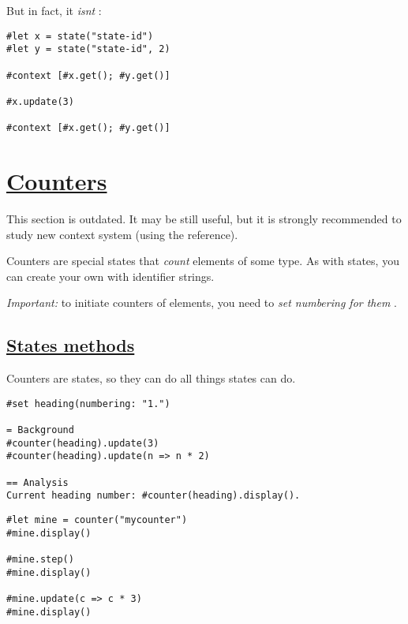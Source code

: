 But in fact, it \emph{isn\textquotesingle t} :

\begin{verbatim}
#let x = state("state-id")
#let y = state("state-id", 2)

#context [#x.get(); #y.get()]

#x.update(3)

#context [#x.get(); #y.get()]
\end{verbatim}

\pandocbounded{}

\section{\texorpdfstring{\hyperref[counters]{Counters}}{Counters}}\label{counters}

This section is outdated. It may be still useful, but it is strongly
recommended to study new context system (using the reference).

Counters are special states that \emph{count} elements of some type. As
with states, you can create your own with identifier strings.

\emph{Important:} to initiate counters of elements, you need to
\emph{set numbering for them} .

\subsection{\texorpdfstring{\hyperref[states-methods]{States
methods}}{States methods}}\label{states-methods}

Counters are states, so they can do all things states can do.

\begin{verbatim}
#set heading(numbering: "1.")

= Background
#counter(heading).update(3)
#counter(heading).update(n => n * 2)

== Analysis
Current heading number: #counter(heading).display().
\end{verbatim}

\pandocbounded{}

\begin{verbatim}
#let mine = counter("mycounter")
#mine.display()

#mine.step()
#mine.display()

#mine.update(c => c * 3)
#mine.display()
\end{verbatim}

